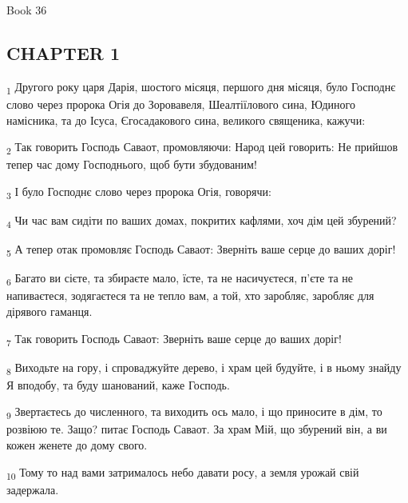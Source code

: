 Book 36
\subsection{CHAPTER 1}
\begin{tcolorbox}
\textsubscript{1} Другого року царя Дарія, шостого місяця, першого дня місяця, було Господнє слово через пророка Огія до Зоровавеля, Шеалтіїлового сина, Юдиного намісника, та до Ісуса, Єгосадакового сина, великого священика, кажучи:
\end{tcolorbox}
\begin{tcolorbox}
\textsubscript{2} Так говорить Господь Саваот, промовляючи: Народ цей говорить: Не прийшов тепер час дому Господнього, щоб бути збудованим!
\end{tcolorbox}
\begin{tcolorbox}
\textsubscript{3} І було Господнє слово через пророка Огія, говорячи:
\end{tcolorbox}
\begin{tcolorbox}
\textsubscript{4} Чи час вам сидіти по ваших домах, покритих кафлями, хоч дім цей збурений?
\end{tcolorbox}
\begin{tcolorbox}
\textsubscript{5} А тепер отак промовляє Господь Саваот: Зверніть ваше серце до ваших доріг!
\end{tcolorbox}
\begin{tcolorbox}
\textsubscript{6} Багато ви сієте, та збираєте мало, їсте, та не насичуєтеся, п'єте та не напиваєтеся, зодягаєтеся та не тепло вам, а той, хто заробляє, заробляє для дірявого гаманця.
\end{tcolorbox}
\begin{tcolorbox}
\textsubscript{7} Так говорить Господь Саваот: Зверніть ваше серце до ваших доріг!
\end{tcolorbox}
\begin{tcolorbox}
\textsubscript{8} Виходьте на гору, і спроваджуйте дерево, і храм цей будуйте, і в ньому знайду Я вподобу, та буду шанований, каже Господь.
\end{tcolorbox}
\begin{tcolorbox}
\textsubscript{9} Звертаєтесь до численного, та виходить ось мало, і що приносите в дім, то розвіюю те. Защо? питає Господь Саваот. За храм Мій, що збурений він, а ви кожен женете до дому свого.
\end{tcolorbox}
\begin{tcolorbox}
\textsubscript{10} Тому то над вами затрималось небо давати росу, а земля урожай свій задержала.
\end{tcolorbox}
